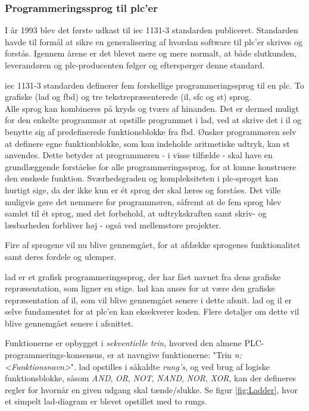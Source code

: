 \subsubsection{Programmeringssprog til \gls{plc}'er}
\noindent I år 1993 blev det første udkast til \gls{iec} 1131-3 standarden publiceret\cite{iecStandard}. Standarden havde til formål at sikre en generalisering af hvordan software til \gls{plc}'er skrives og forstås. Igennem årene er det blevet mere og mere normalt, at både slutkunden, leverandøren og \gls{plc}-producenten følger og efterspørger denne standard. 

\gls{iec} 1131-3 standarden definerer fem forskellige programmeringssprog til en \gls{plc}. 
To grafiske (\gls{lad} og \gls{fbd}) og tre tekstrepræsenterede (\gls{il}, \gls{sfc} og \gls{st}) sprog. \\
\noindent Alle sprog kan kombineres på kryds og tværs af hinanden. Det er dermed muligt for den enkelte programmør at opstille programmet i \gls{lad}, ved at skrive det i \gls{il} og benytte sig af predefinerede funktionsblokke fra \gls{fbd}. Ønsker programmøren selv at definere egne funktionblokke, som kan indeholde aritmetiske udtryk, kan \gls{st} anvendes. Dette betyder at programmøren - i visse tilfælde - skal have en grundlæggende forståelse for alle programmeringssprog, for at kunne konstruere den ønskede funktion. Sværhedsgraden og kompleksiteten i \gls{plc}-sproget kan hurtigt sige, da der ikke kun er ét sprog der skal læres og forståes. Det ville muligvis gøre det nemmere for programmøren, såfremt at de fem sprog blev samlet til ét sprog, med det forbehold, at udtrykskraften samt skriv- og læsbarheden forbliver høj - også ved mellemstore projekter.

Fire af sprogene vil nu blive gennemgået, for at afdække sprogenes funktionalitet samt deres fordele og ulemper. 

\label{subsec:lad}
\gls{lad} er et grafisk programmeringssprog, der har fået navnet fra dens grafiske repræsentation, som ligner en stige. \gls{lad} kan anses for at være den grafiske repræsentation af \gls{il}, som vil blive gennemgået senere i dette afsnit. \gls{lad} og \gls{il} er selve fundamentet for at \gls{plc}'en kan eksekverer koden. Flere detaljer om dette vil blive gennemgået senere i afsnittet.

Funktionerne er opbygget i \textit{sekventielle trin}, hvorved den almene PLC-programmerings-konsensus, er at navngive funktionerne: "Trin \textit{n: <Funktionsnavn>}".  
\gls{lad} opstilles i såkaldte \textit{rung's}, og ved brug af logiske funktionsblokke, såsom \textit{AND}, \textit{OR}, \textit{NOT}, \textit{NAND}, \textit{NOR}, \textit{XOR}, kan der defineres regler for hvornår en given udgang skal tænde/slukke. Se figur \ref{fig:Ladder}, hvor et simpelt \gls{lad}-diagram er blevet opstillet med to rungs.


